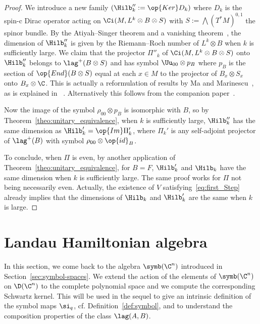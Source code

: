 \begin{proof}
We introduce a new family $(\Hilb''_k:= \op{Ker} D_k)$ where $D_k$ is the spin-c Dirac operator acting on $\Ci (M, L^k \otimes B \otimes S)$ with  $S :=\bigwedge (T^*M)^{0,1} $  the spinor bundle. By the Atiyah--Singer theorem and a vanishing theorem~\cite{BoUr96,MaMa02}, the dimension of $\Hilb''_k$ is given by the Riemann--Roch number of $L^k \otimes B$ when $k$ is sufficiently large. We claim that the projector $\Pi''_k$ of $\Ci (M, L^k \otimes B \otimes S)$ onto $\Hilb_k''$ belongs to $\lag ^+ (B \otimes S)$ and has symbol $\Uu_{00}
\otimes p_B$ where $p_B $ is the section of $\op{End} (B \otimes S)$ equal at each $x\in M$ to the projector of $B_x \otimes S_x$ onto $B_x \otimes
\C$. This is actually a reformulation of results by Ma and Marinescu~\cite{MaMa}, as is explained in ~\cite[Appendix A]{oim}.  Alternatively this follows from the companion paper~\cite{oim_copain}.

Now the image of the symbol $\rho_{00} \otimes p_B$ is isomorphic with $B$, so by Theorem~\ref{theo:unitary_equivalence}, when $k$ is sufficiently large, $\Hilb''_k$ has the same dimension as $\Hilb_k' = \op{Im} \Pi'_k$, where $\Pi_k'$ is any self-adjoint projector of $\lag^+(B)$ with symbol $ \rho_{00} \otimes \op{id}_B$.

To conclude, when $\Pi$ is even, by another application of Theorem~\ref{theo:unitary_equivalence}, for $B=F$, $\Hilb'_k$ and $\Hilb_k$ have the same dimension when $k$ is sufficiently large.  The same proof works for $\Pi$ not being necessarily even. Actually, the existence of $V$ satisfying~\eqref{eq:first_Step} already implies that the dimensions of $\Hilb_k$ and $\Hilb_k'$ are the same when $k$ is large. 
\end{proof}



\section{Landau Hamiltonian algebra} \label{sec:landau-levels-cn}

In this section, we come back to the algebra $\symb (\C^n)$ introduced in Section~\ref{sec:symbol-spaces}. We extend the action of the elements of $\symb (\C^n)$ on $\D (\C^n)$ to the complete polynomial space and we compute the corresponding Schwartz kernel. This will be used in the sequel to give an intrinsic definition of the symbol maps $\si_q$, cf. Definition~\ref{def:symbol}, and to understand the composition properties of the class $\lag (A,B)$.



